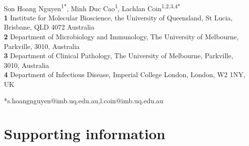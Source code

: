 \documentclass[10pt,letterpaper]{article}
\renewcommand{\figurename}{Fig}
\newcommand{\npgraph}{$\mathtt{npGraph}$}
\newcommand{\unicycler}{$\mathtt{Unicycler}$}
\begin{document}
\vspace*{0.2in}

\begin{flushleft}
{\Large
\textbf{} %
}
\newline
\\
Son Hoang Nguyen\textsuperscript{1*},
Minh Duc Cao\textsuperscript{1},
Lachlan Coin\textsuperscript{1,2,3,4*}
\\
\bigskip
\textbf{1} Institute for Molecular Bioscience, the University of Queensland, 
St Lucia, Brisbane, QLD 4072 Australia
\\
\textbf{2} Department of Microbiology and Immunology, The University of Melbourne, Parkville, 3010, Australia
\\
\textbf{3} Department of Clinical Pathology, The University of Melbourne, Parkville, 3010, Australia
\\
\textbf{4} Department of Infectious Disease, Imperial College London, London, W2 1NY, UK
\bigskip

*s.hoangnguyen@imb.uq.edu.au,l.coin@imb.uq.edu.au

\end{flushleft}

\section*{Supporting information}
\renewcommand{\figurename}{Supporting Figure}
\renewcommand{\tablename}{Supporting Table}
\renewcommand\thefigure{S\arabic{figure}}    
\setcounter{figure}{0}    

\end{document}
